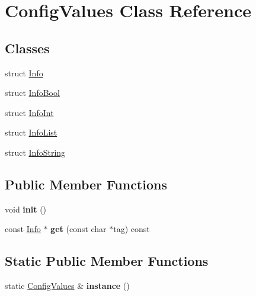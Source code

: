 \hypertarget{class_config_values}{}\section{Config\+Values Class Reference}
\label{class_config_values}
\subsection*{Classes}
\begin{DoxyCompactItemize}
\item 
struct \mbox{\hyperlink{struct_config_values_1_1_info}{Info}}
\item 
struct \mbox{\hyperlink{struct_config_values_1_1_info_bool}{Info\+Bool}}
\item 
struct \mbox{\hyperlink{struct_config_values_1_1_info_int}{Info\+Int}}
\item 
struct \mbox{\hyperlink{struct_config_values_1_1_info_list}{Info\+List}}
\item 
struct \mbox{\hyperlink{struct_config_values_1_1_info_string}{Info\+String}}
\end{DoxyCompactItemize}
\subsection*{Public Member Functions}
\begin{DoxyCompactItemize}
\item 
\mbox{\label{class_config_values_a0e441a9b1d5ede5a39c057736578bb55}} 
void {\bfseries init} ()
\item 
\mbox{\label{class_config_values_ab1a64e2e44de8ff03ef91cfbac2c8863}} 
const \mbox{\hyperlink{struct_config_values_1_1_info}{Info}} $\ast$ {\bfseries get} (const char $\ast$tag) const
\end{DoxyCompactItemize}
\subsection*{Static Public Member Functions}
\begin{DoxyCompactItemize}
\item 
\mbox{\label{class_config_values_aa30d3cc90505491550d5e7a0bd407e53}} 
static \mbox{\hyperlink{class_config_values}{Config\+Values}} \& {\bfseries instance} ()
\end{DoxyCompactItemize}
